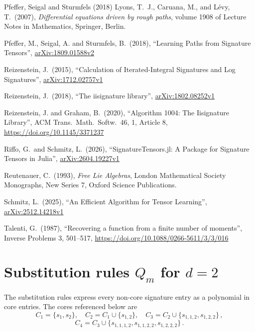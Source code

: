 \documentclass[11pt,english]{article}
\begin{document}
\begin{thebibliography}{Pfeffer, Seigal and Sturmfels (2018)}
Lyons, T.~J., Caruana, M.,
and Lévy, T.\ (2007), \emph{Differential equations driven by rough paths},
volume 1908 of Lecture Notes in Mathematics, Springer, Berlin.

Pfeffer, M.,
Seigal, A. and Sturmfels, B.\ (2018), ``Learning Paths from Signature
Tensors'', \href{https://arxiv.org/abs/1809.01588v2}{arXiv:1809.01588v2}

Reizenstein, J.\ (2015),
``Calculation of Iterated-Integral Signatures and Log Signatures'',
\href{https://arxiv.org/abs/1712.02757v1}{arXiv:1712.02757v1}

Reizenstein, J.\ (2018),
``The iisignature library'',
\href{https://arxiv.org/abs/1802.08252v1}{arXiv:1802.08252v1}

Reizenstein, J.
and Graham, B.\ (2020), ``Algorithm 1004: The Iisignature Library'',
ACM Trans.\ Math.\ Softw.\ 46, 1, Article 8,
\href{https://doi.org/10.1145/3371237}{https://doi.org/10.1145/3371237}

Riffo, G.\ and
Schmitz, L.\ (2026), ``SignatureTensors.jl: A Package for Signature
Tensors in Julia'',
\href{https://arxiv.org/abs/2604.19227v1}{arXiv:2604.19227v1}

Reutenauer, C.\ (1993),
\emph{Free Lie Algebras}, London Mathematical Society Monographs,
New Series 7, Oxford Science Publications.

Schmitz, L.\ (2025), ``An
Efficient Algorithm for Tensor Learning'',
\href{https://arxiv.org/abs/2512.14218v1}{arXiv:2512.14218v1}

Talenti, G.\ (1987), ``Recovering
a function from a finite number of moments'', Inverse Problems 3,
501--517,
\href{https://doi.org/10.1088/0266-5611/3/3/016}{https://doi.org/10.1088/0266-5611/3/3/016}

\end{thebibliography}

\appendix
\section{Substitution rules $Q_{m}$ for $d=2$\label{app:Q}}

The substitution rules express every non-core signature entry as a
polynomial in core entries. The cores referenced below are
\[
C_{1}=\{s_{1},s_{2}\},\quad C_{2}=C_{1}\cup\{s_{1,2}\},\quad C_{3}=C_{2}\cup\{s_{1,1,2},s_{1,2,2}\}\,,
\]
\[
C_{4}=C_{3}\cup\{s_{1,1,1,2},s_{1,1,2,2},s_{1,2,2,2}\}\,.
\]
\end{document}
